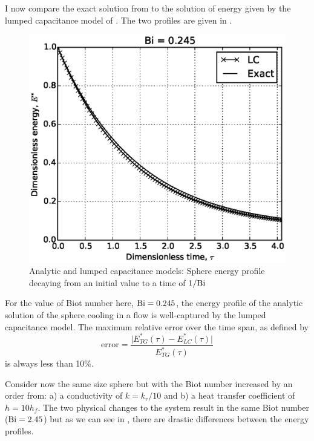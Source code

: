 I now compare the exact solution from  to the solution of energy given by the lumped capacitance model of . The two profiles are given in . 

\begin{figure}[ht]
	\centering
		\includegraphics[width=\singleimagewidth]{figures/LC-analytic-sphere-in-fluid}
	\caption[Analytic temperature profile for $\Bi < 1$]{Analytic and lumped capacitance models: Sphere energy profile decaying from an initial value to a time of $1/\mathrm{Bi}$}
	\label{fig:LC-analytic-sphere-in-fluid}
\end{figure}

For the value of Biot number here, $\mathrm{Bi} = 0.245$, the energy profile of the analytic solution of the sphere cooling in a flow is well-captured by the lumped capacitance model. The maximum relative error over the time span, as defined by
\begin{equation}\label{eq:error}
	\text{error} = \frac{\big|E^*_{TG}(\tau) - E^*_{LC}(\tau) \big|}{E^*_{TG}(\tau)}
\end{equation}
is always less than 10\%. 

Consider now the same size sphere but with the Biot number increased by an order from: a) a conductivity of $k = k_r/10$ and b) a heat transfer coefficient of $h = 10h_f$. The two physical changes to the system result in the same Biot number ($\mathrm{Bi} = 2.45$) but as we can see in , there are drastic differences between the energy profiles.

